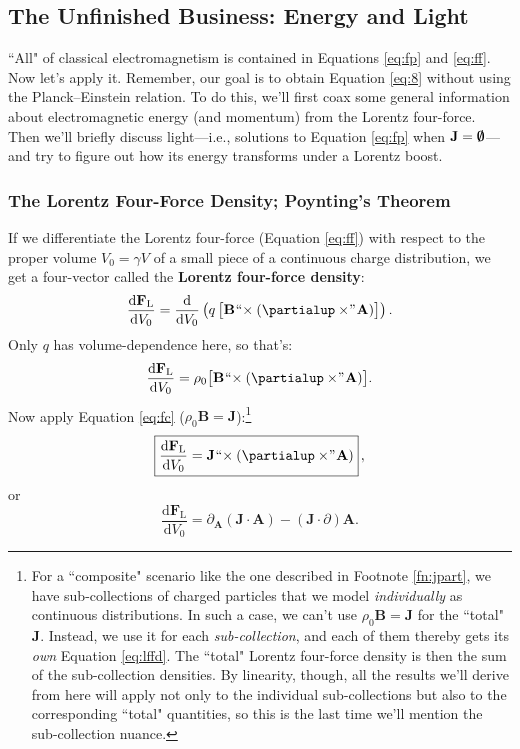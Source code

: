 \documentclass[12pt]{article}
\renewcommand{\vv}[1]{\mathbf{#1}}
\newcommand{\dd}[1]{\mathrm{d}#1}
\begin{document}
\subsection{The Unfinished Business: Energy and Light}

``All" of classical electromagnetism is contained in Equations \ref{eq:fp} and \ref{eq:ff}. Now let's apply it. Remember, our goal is to obtain Equation \ref{eq:8} without using the Planck--Einstein relation. To do this, we'll first coax some general information about electromagnetic energy (and momentum) from the Lorentz four-force. Then we'll briefly discuss light---i.e., solutions to Equation \ref{eq:fp} when $\vv J = \textrm{\mbox{\boldmath $\emptyset$}}$---and try to figure out how its energy transforms under a Lorentz boost.

\subsubsection{The Lorentz Four-Force Density; Poynting's Theorem}\label{sssec:lffd}

If we differentiate the Lorentz four-force (Equation \ref{eq:ff}) with respect to the proper volume ${V_0 = \gamma V}$ of a small piece of a continuous charge distribution, we get a four-vector called the \textbf{Lorentz four-force density}:
\begin{equation*}
\dfrac{\dd \vv F_{\mathrm{L}}}{\dd V_0} = \dfrac{\dd}{\dd V_0} \left( q \, \bigl[ \vv B \mkern1mu `` \mkern-4mu \times (\partialup \times \mkern-4mu " \mkern1mu \vv A) \bigr]  \right) .
\end{equation*}
Only $q$ has volume-dependence here, so that's:
\begin{equation*}
\dfrac{\dd \vv F_{\mathrm{L}}}{\dd V_0} = \rho_0 \bigl[ \vv B \mkern1mu `` \mkern-4mu \times (\partialup \times \mkern-4mu " \mkern1mu \vv A) \bigr] .
\end{equation*}
Now apply Equation \ref{eq:fc} ($\rho_0 \vv B = \vv J$):\footnote{For a ``composite" scenario like the one described in Footnote \ref{fn:jpart}, we have sub-collections of charged particles that we model \emph{individually} as continuous distributions. In such a case, we can't use $\rho_0 \vv B = \vv J$ for the ``total" $\vv J$. Instead, we use it for each \emph{sub-collection}, and each of them thereby gets its \emph{own} Equation \ref{eq:lffd}. The ``total" Lorentz four-force density is then the sum of the sub-collection densities. By linearity, though, all the results we'll derive from here will apply not only to the individual sub-collections but also to the corresponding ``total" quantities, so this is the last time we'll mention the sub-collection nuance.}
\begin{equation}\label{eq:lffd}
\boxed{ \dfrac{\dd \vv F_{\mathrm{L}}}{\dd V_0} = \vv J \mkern1mu `` \mkern-4mu \times (\partialup \times \mkern-4mu " \mkern1mu \vv A) } \, ,
\end{equation}
or
\begin{equation*}
\dfrac{\dd \vv F_{\mathrm{L}}}{\dd V_0} = \partialup_{\vv A} (\vv J \cdot \vv A) - ( \vv J \cdot \partialup) \vv A .
\end{equation*}
\end{document}
